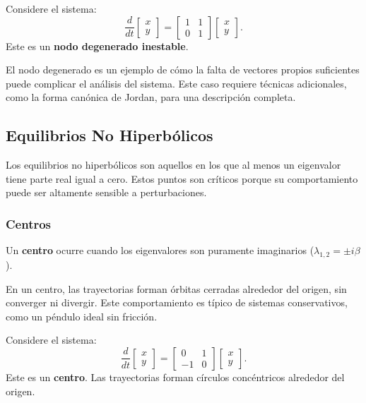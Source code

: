 \begin{example}
Considere el sistema:
\[
\frac{d}{dt} \begin{bmatrix} x \\ y \end{bmatrix} = \begin{bmatrix} 1 & 1 \\ 0 & 1 \end{bmatrix} \begin{bmatrix} x \\ y \end{bmatrix}.
\]
Este es un \textbf{nodo degenerado inestable}.
\end{example}

El nodo degenerado es un ejemplo de cómo la falta de vectores propios suficientes puede complicar el análisis del sistema. Este caso requiere técnicas adicionales, como la forma canónica de Jordan, para una descripción completa.

\subsection{Equilibrios No Hiperbólicos}

Los equilibrios no hiperbólicos son aquellos en los que al menos un eigenvalor tiene parte real igual a cero. Estos puntos son críticos porque su comportamiento puede ser altamente sensible a perturbaciones.

\subsubsection{Centros}

\begin{definition}
Un \textbf{centro} ocurre cuando los eigenvalores son puramente imaginarios ($\lambda_{1,2} = \pm i\beta$).
\end{definition}

En un centro, las trayectorias forman órbitas cerradas alrededor del origen, sin converger ni divergir. Este comportamiento es típico de sistemas conservativos, como un péndulo ideal sin fricción.

\begin{example}
Considere el sistema:
\[
\frac{d}{dt} \begin{bmatrix} x \\ y \end{bmatrix} = \begin{bmatrix} 0 & 1 \\ -1 & 0 \end{bmatrix} \begin{bmatrix} x \\ y \end{bmatrix}.
\]
Este es un \textbf{centro}. Las trayectorias forman círculos concéntricos alrededor del origen.
\end{example}

